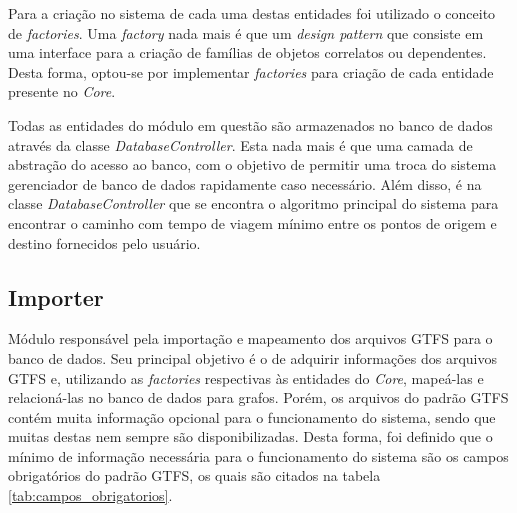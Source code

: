 Para a criação no sistema de cada uma destas entidades foi utilizado o conceito de \emph{factories}. 
Uma \emph{factory} nada mais é que um \emph{design pattern} que consiste em uma interface para a criação de famílias de objetos correlatos ou dependentes.
Desta forma, optou-se por implementar \emph{factories} para criação de cada entidade presente no \emph{Core}.

Todas as entidades do módulo em questão são armazenados no banco de dados através da classe \emph{DatabaseController}.
Esta nada mais é que uma camada de abstração do acesso ao banco, com o objetivo de permitir uma troca do sistema gerenciador de banco de dados rapidamente caso necessário.
Além disso, é na classe \emph{DatabaseController} que se encontra o algoritmo principal do sistema para encontrar o caminho com tempo de viagem mínimo entre os pontos de origem e destino fornecidos pelo usuário.


\subsection{Importer}
Módulo responsável pela importação e mapeamento dos arquivos GTFS para o banco de dados. 
Seu principal objetivo é o de adquirir informações dos arquivos GTFS e, utilizando as \emph{factories} respectivas às entidades do \emph{Core}, mapeá-las e relacioná-las no banco de dados para grafos.
Porém, os arquivos do padrão GTFS contém muita informação opcional para o funcionamento do sistema, sendo que muitas destas nem sempre são disponibilizadas. 
Desta forma, foi definido que o mínimo de informação necessária para o funcionamento do sistema são os campos obrigatórios do padrão GTFS, os quais são citados na tabela \ref{tab:campos_obrigatorios}.


